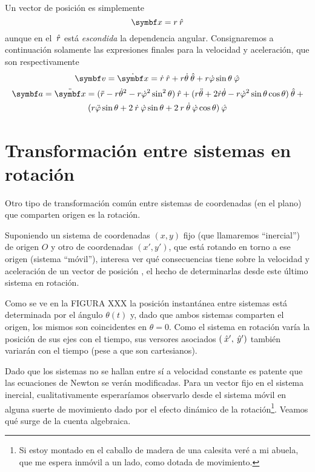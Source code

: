 \documentclass[10pt,oneside]{CBFT_book}
\begin{document}
Un vector de posición es simplemente
\[
	\vb{x} = r \rver
\]
aunque en el $\:\hat{r}$ está {\it escondida} la dependencia angular. Consignaremos a continuación solamente las expresiones finales para la
velocidad y aceleración, que son respectivamente
\[
	\vb{v} = \dot{\vb{x}} = \dot{r} \rver + r\dot{\theta}\thetaver + r\dot{\vp}\sin\theta\phiver
\]
\begin{multline*} %
	\!\: \vb{a} = \ddot{\vb{x}} = ( \ddot{r} - r\dot{\theta}^2 - r\dot{\vp}^2 \sin^2 \theta )\rver +
	( r\ddot{\theta} + 2\dot{r}\dot{\theta} - r\dot{\vp}^2 \sin \theta \cos\theta )\thetaver \: + \\
	( r \ddot{\vp}\sin\theta + 2 \: \dot{r} \: \dot{\vp} \sin\theta + 2 \: r \:\dot{\theta} \:\dot{\vp} \cos\theta )\phiver 
\end{multline*}
	

\section{Transformación entre sistemas en rotación}

Otro tipo de transformación común entre sistemas de coordenadas (en el plano) que comparten origen es la rotación.

Suponiendo un sistema de coordenadas $(x,y)$ fijo (que llamaremos ``inercial'') de origen $O$ y otro de coordenadas $(x',y')$, que está rotando 
en torno a ese origen (sistema ``móvil''), interesa ver qué consecuencias tiene sobre la velocidad y aceleración de un vector de posición ,
el hecho de determinarlas desde este último sistema en rotación. 

Como se ve en la FIGURA XXX 
la posición instantánea entre sistemas está determinada por el ángulo $\theta(t)$ y, dado que ambos sistemas comparten el origen, los mismos son 
coincidentes en $\theta = 0$. Como el sistema en rotación varía la posición de sus ejes con el tiempo, sus versores asociados $(\:\hat{x}', \:\hat{y}')$ 
también variarán con el tiempo (pese a que son cartesianos).

Dado que los sistemas no se hallan entre sí a velocidad constante es patente que las ecuaciones de Newton se verán modificadas.
Para un vector  fijo en el sistema inercial, cualitativamente esperaríamos observarlo desde el sistema móvil en alguna suerte de movimiento
dado por el efecto dinámico de la rotación\footnote{Si estoy montado en el caballo de madera de una calesita veré a mi abuela, que me espera 
inmóvil a un lado, como dotada de movimiento.}. Veamos qué surge de la cuenta algebraica.
\end{document}
